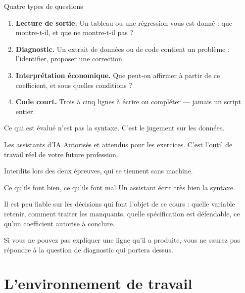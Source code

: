 \documentclass[10pt,aspectratio=169]{beamer}
\begin{document}
\begin{frame}{Quatre types de questions}
\begin{enumerate}
  \item \textbf{Lecture de sortie.} Un tableau ou une régression vous est donné : que montre-t-il, et que ne montre-t-il pas ?
  \item \textbf{Diagnostic.} Un extrait de données ou de code contient un problème : l'identifier, proposer une correction.
  \item \textbf{Interprétation économique.} Que peut-on affirmer à partir de ce coefficient, et sous quelles conditions ?
  \item \textbf{Code court.} Trois à cinq lignes à écrire ou compléter --- jamais un script entier.
\end{enumerate}
\vfill
Ce qui est évalué n'est pas la syntaxe. C'est le \alert{jugement sur les données}.
\end{frame}

\begin{frame}{Les assistants d'IA}
Autorisés et attendus pour les exercices. C'est l'outil de travail réel de votre future profession.

Interdits lors des deux épreuves, qui se tiennent sans machine.

\vspace{1.2em}
\begin{block}{Ce qu'ils font bien, ce qu'ils font mal}
Un assistant écrit très bien la syntaxe.

\vspace{0.4em}
Il est peu fiable sur les décisions qui font l'objet de ce cours : quelle variable retenir, comment traiter les manquants, quelle spécification est défendable, ce qu'un coefficient autorise à conclure.
\end{block}

\vspace{0.8em}
Si vous ne pouvez pas expliquer une ligne qu'il a produite, vous ne saurez pas répondre à la question de diagnostic qui portera dessus.
\end{frame}

\section{L'environnement de travail}
\end{document}

